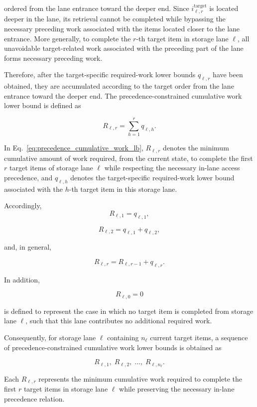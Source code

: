 ordered from the lane entrance toward the deeper end. Since
\(i^{\mathrm{target}}_{\ell,r}\) is located deeper in the lane, its retrieval
cannot be completed while bypassing the necessary preceding work associated
with the items located closer to the lane entrance. More generally, to
complete the \(r\)-th target item in storage lane \(\ell\), all unavoidable
target-related work associated with the preceding part of the lane forms
necessary preceding work.

Therefore, after the target-specific required-work lower bounds
\(q_{\ell,r}\) have been obtained, they are accumulated according to the
target order from the lane entrance toward the deeper end. The
precedence-constrained cumulative work lower bound is defined as

\begin{equation}
R_{\ell,r}
=
\sum_{h=1}^{r}
q_{\ell,h}.
\label{eq:precedence_cumulative_work_lb}
\end{equation}

In Eq.~\eqref{eq:precedence_cumulative_work_lb}, \(R_{\ell,r}\) denotes the
minimum cumulative amount of work required, from the current state, to complete
the first \(r\) target items of storage lane \(\ell\) while respecting the
necessary in-lane access precedence, and \(q_{\ell,h}\) denotes the
target-specific required-work lower bound associated with the \(h\)-th target
item in this storage lane.

Accordingly,
\[
R_{\ell,1}
=
q_{\ell,1},
\]

\[
R_{\ell,2}
=
q_{\ell,1}
+
q_{\ell,2},
\]

and, in general,

\begin{equation}
R_{\ell,r}
=
R_{\ell,r-1}
+
q_{\ell,r}.
\end{equation}

In addition,

\[
R_{\ell,0}=0
\]

is defined to represent the case in which no target item is completed from
storage lane \(\ell\), such that this lane contributes no additional required
work.

Consequently, for storage lane \(\ell\) containing \(n_\ell\) current target
items, a sequence of precedence-constrained cumulative work lower bounds is
obtained as

\[
R_{\ell,1},
\;
R_{\ell,2},
\;
\ldots,
\;
R_{\ell,n_\ell}.
\]

Each \(R_{\ell,r}\) represents the minimum cumulative work required to complete
the first \(r\) target items in storage lane \(\ell\) while preserving the
necessary in-lane precedence relation.

